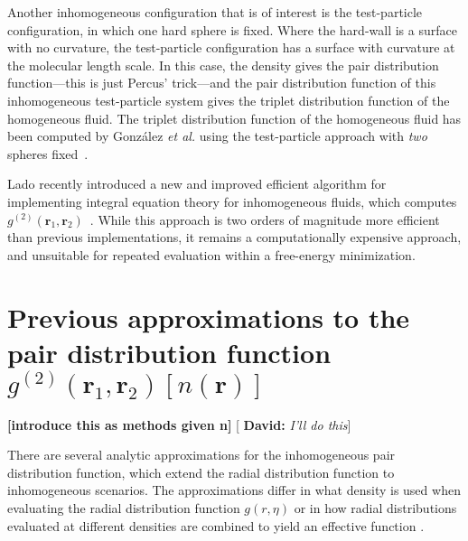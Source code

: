 \documentclass[letterpaper,twocolumn,amsmath,amssymb,pre,aps,10pt]{revtex4-1}
\newcommand{\red}[1]{{\bf \color{red} #1}}
\newcommand{\green}[1]{{\bf \color{green} #1}}
\newcommand{\rr}{\textbf{r}}
\newcommand{\fixme}[1]{\red{[#1]}}
\newcommand{\davidsays}[1]{{\color{red} [\green{David:} \emph{#1}]}}
\begin{document}
Another inhomogeneous configuration that is of interest is the
test-particle configuration, in which one hard sphere is fixed.  Where
the hard-wall is a surface with no curvature, the test-particle
configuration has a surface with curvature at the molecular length
scale.  In this case, the density gives the pair distribution
function---this is just Percus' trick---and the pair distribution
function of this inhomogeneous test-particle system gives the triplet
distribution function of the homogeneous fluid.  The triplet
distribution function of the homogeneous fluid has been computed by
Gonz\'alez \emph{et al.} using the test-particle approach with
\emph{two} spheres fixed~\cite{gonzalez1999test}.

Lado recently introduced a new and improved efficient algorithm for
implementing integral equation theory for inhomogeneous fluids, which
computes $g^{(2)}(\rr_1,\rr_2)$~\cite{lado2009efficient}.  While this
approach is two orders of magnitude more efficient than previous
implementations, it remains a computationally expensive approach, and
unsuitable for repeated evaluation within a free-energy minimization.

\section{Previous approximations to the pair distribution function
  $g^{(2)}(\rr_1,\rr_2)[n(\rr)]$}\label{sec:gn}

\fixme{introduce this as methods given n}\davidsays{I'll do this}

There are several analytic approximations for the inhomogeneous pair
distribution function, which extend the radial distribution function
to inhomogeneous scenarios.  The approximations differ in what density
is used when evaluating the radial distribution function $g(r,\eta)$
or in how radial distributions evaluated at different densities are
combined to yield an effective function
\cite{toxvaerd1973statistical}.
\end{document}
